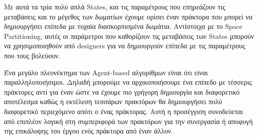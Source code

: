 Με αυτά τα τρία πολύ απλά States, και τις παραμέτρους που επηρεάζουν τις μεταβάσεις και το μέγεθος των δωματίων έχουμε ορίσει έναν πράκτορα που μπορεί να δημιουργήσει επίπεδα με τυχαία διασκορπισμένα δωμάτια. Αντίστοιχα με το Space Partitioning, αυτές οι παράμετροι που καθορίζουν τις μεταβάσεις των States μπορούν να χρησιμοποιηθούν από designers για να δημιουργούν επίπεδα με τις παραμέτρους που τους βολεύουν.
\par
Ένα μεγάλο πλεονέκτημα των Agent-based αλγορίθμων είναι ότι είναι παραλληλοποιήσιμοι. Δηλαδή μπορούμε να αρχικοποιήσουμε ένα επίπεδο με τέσσερις πράκτορες αντί για έναν ώστε να έχουμε πιο γρήγορη δημιουργία και διαφορετικό αποτέλεσμα καθώς η εκτέλεση τεσσάρων πρακτόρων θα δημιουργήσει πολύ διαφορετικό περιεχόμενο απότι ο ένας πράκτορας. Αυτή η προσέγγιση συνοδεύεται από επιπλέον λογική στη συμπεριφορά των πρακτόρων για την συνεργασία ή αποφυγή της επικάλυψης του έργου ενός πράκτορα από έναν άλλον.

